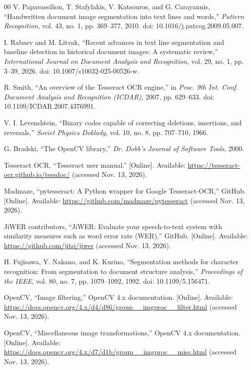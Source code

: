 \documentclass[conference]{IEEEtran}
\begin{document}
\begin{thebibliography}{00}
V. Papavassiliou, T. Stafylakis, V. Katsouros, and G. Carayannis, ``Handwritten document image segmentation into text lines and words,'' \emph{Pattern Recognition}, vol. 43, no. 1, pp. 369--377, 2010. doi: 10.1016/j.patcog.2009.05.007.

I. Rabaev and M. Litvak, ``Recent advances in text line segmentation and baseline detection in historical document images: A systematic review,'' \emph{International Journal on Document Analysis and Recognition}, vol. 29, no. 1, pp. 3--39, 2026. doi: 10.1007/s10032-025-00526-w.

R. Smith, ``An overview of the Tesseract OCR engine,'' in \emph{Proc. 9th Int. Conf. Document Analysis and Recognition (ICDAR)}, 2007, pp. 629--633. doi: 10.1109/ICDAR.2007.4376991.

V. I. Levenshtein, ``Binary codes capable of correcting deletions, insertions, and reversals,'' \emph{Soviet Physics Doklady}, vol. 10, no. 8, pp. 707--710, 1966.

G. Bradski, ``The OpenCV library,'' \emph{Dr. Dobb's Journal of Software Tools}, 2000.

Tesseract OCR, ``Tesseract user manual.'' [Online]. Available: \url{https://tesseract-ocr.github.io/tessdoc/} (accessed Nov. 13, 2026).

Madmaze, ``pytesseract: A Python wrapper for Google Tesseract-OCR,'' GitHub. [Online]. Available: \url{https://github.com/madmaze/pytesseract} (accessed Nov. 13, 2026).

JiWER contributors, ``JiWER: Evaluate your speech-to-text system with similarity measures such as word error rate (WER),'' GitHub. [Online]. Available: \url{https://github.com/jitsi/jiwer} (accessed Nov. 13, 2026).

H. Fujisawa, Y. Nakano, and K. Kurino, ``Segmentation methods for character recognition: From segmentation to document structure analysis,'' \emph{Proceedings of the IEEE}, vol. 80, no. 7, pp. 1079--1092, 1992. doi: 10.1109/5.156471.

OpenCV, ``Image filtering,'' OpenCV 4.x documentation. [Online]. Available: \url{https://docs.opencv.org/4.x/d4/d86/group__imgproc__filter.html} (accessed Nov. 13, 2026).

OpenCV, ``Miscellaneous image transformations,'' OpenCV 4.x documentation. [Online]. Available: \url{https://docs.opencv.org/4.x/d7/d1b/group__imgproc__misc.html} (accessed Nov. 13, 2026).


\end{thebibliography}
\end{document}

